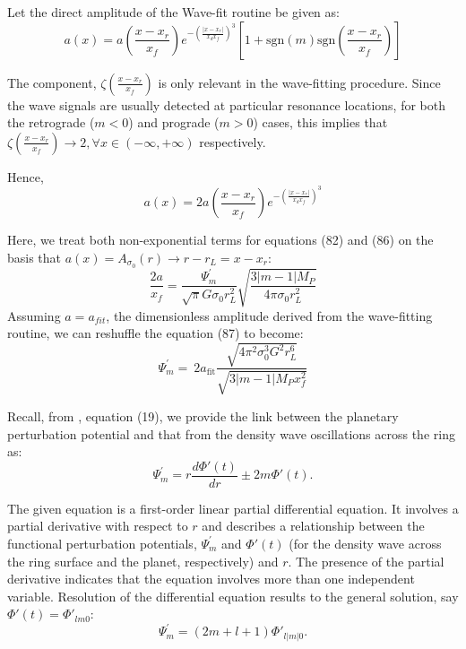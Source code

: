 \documentclass{article}
\begin{document}
\vspace{5pt}

Let the direct amplitude of the Wave-fit routine be given as:
\begin{equation}
    a(x) = a(\frac{x-x_{r}}{x_{f}})e^{-\left(\frac{|x-x_{r}|}{x_{d}x_{f}}\right)^{3}}[1 + \mathrm{sgn}(m) \mathrm{sgn}(\frac{x-x_{r}}{x_{f}})]
\end{equation}

The component, $\zeta(\frac{x-x_{r}}{x_{f}})$ is only relevant in the wave-fitting procedure. Since the wave signals are usually detected at particular resonance locations, for both the retrograde ($m<0$) and prograde ($m>0$) cases, this implies that $\zeta(\frac{x-x_{r}}{x_{f}}) \rightarrow 2, \forall  x \in (-\infty,+\infty)$ respectively.

Hence,
\begin{equation}
    a(x) = 2a(\frac{x-x_{r}}{x_{f}})e^{-\left(\frac{|x-x_{r}|}{x_{d}x_{f}}\right)^{3}}
\end{equation}

Here, we treat both non-exponential terms for equations (82) and (86) on the basis that $a(x) = A_{\sigma_{0}}(r) \rightarrow r-r_{L} = x-x_{r}$:
\begin{equation}
    \frac{2a}{x_{f}} = \frac{\Psi^{'}_{m}}{\sqrt{\pi} G\sigma_{0}r_{L}^{2}}\sqrt{\frac{3|m-1|M_{P}}{4\pi\sigma_{0}r_{L}^{2}}}
\end{equation}
Assuming $a = a_{fit}$, the dimensionless amplitude derived from the wave-fitting routine, we can reshuffle the equation (87) to become:
\begin{equation}
   \Psi^{'}_{m} = \ 2a_{\text{fit}} \frac{\sqrt{4\pi^{2}\sigma_{0}^{3}G^{2}r_{L}^{6}}}{\sqrt{3|m-1|M_{P} x_{f}^{2}}}
\end{equation}


Recall, from \cite{Marley1993PlanetaryAM}, equation (19), we provide the link between the planetary perturbation potential and that from the density wave oscillations across the ring as:
\begin{equation}
    \Psi^{'}_{m} = r \frac{{d \Phi}{'}(t)}{dr} \pm 2m\Phi{'}(t).
\end{equation}

The given equation is a first-order linear partial differential equation. It involves a partial derivative with respect to $r$ and describes a relationship between the functional perturbation potentials, $\Psi^{'}_{m}$ and $\Phi{'}(t)$ (for the density wave across the ring surface and the planet, respectively) and $r$. The presence of the partial derivative indicates that the equation involves more than one independent variable. Resolution of the differential equation results to the general solution, say $\Phi{'}(t) = \Phi{'}_{lm0}$:
\begin{equation}
   \Psi^{'}_{m} = (2m +l+1)\Phi{'}_{l|m|0}.
\end{equation}
\end{document}
